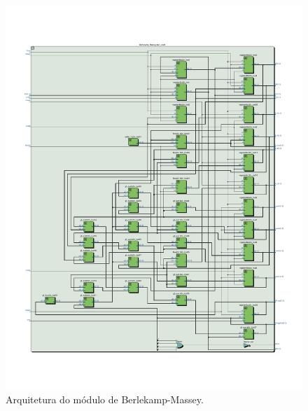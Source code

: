 \begin{figure}[!htb]
	\caption{\label{fig_berlekamp_arq}Arquitetura do módulo de Berlekamp-Massey.}
	\centering
	\includegraphics[width=1\textwidth, trim={2cm 5cm 2cm 5cm}]{RS/BerlekampRTL.pdf}
	\legend{}
\end{figure}

